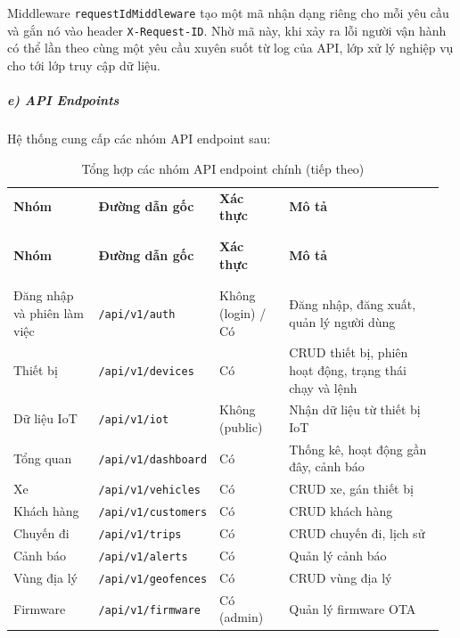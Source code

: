 \documentclass[a4paper]{extarticle}
\newcommand{\thesissettableid}[2]{%
  \renewcommand{\thetable}{#1}%
  \renewcommand{\theHtable}{#2}%
}
\begin{document}
Middleware \texttt{requestIdMiddleware} tạo một mã nhận dạng riêng cho
mỗi yêu cầu và gắn nó vào header \texttt{X-Request-ID}. Nhờ mã này, khi
xảy ra lỗi người vận hành có thể lần theo cùng một yêu cầu xuyên suốt từ
log của API, lớp xử lý nghiệp vụ cho tới lớp truy cập dữ liệu.

\subparagraph{e) API Endpoints}\label{e-api-endpoints}

Hệ thống cung cấp các nhóm API endpoint sau:


{\thesissettableid{4.8}{tab-ch4-tong-hop-cac-nhom-api-endpoint-chinh}
\def\LTcaptype{table}
\begin{longtable}{|L{0.213\linewidth}|L{0.141\linewidth}|L{0.172\linewidth}|L{0.429\linewidth}|}
\caption{Tổng hợp các nhóm API endpoint chính}\label{tab:ch4-tong-hop-cac-nhom-api-endpoint-chinh}\\
\hline \textbf{Nhóm} & \textbf{Đường dẫn gốc} & \textbf{Xác thực} & \textbf{Mô tả} \\
\\\hline
\endfirsthead
\caption[]{Tổng hợp các nhóm API endpoint chính (tiếp theo)}\\
\hline \textbf{Nhóm} & \textbf{Đường dẫn gốc} & \textbf{Xác thực} & \textbf{Mô tả} \\
\\\hline
\endhead
\\\hline
\endfoot
\endlastfoot
Đăng nhập và phiên làm việc & \nolinkurl{/api/v1/auth} & Không (login) / Có & Đăng nhập,
đăng xuất, quản lý người dùng \\\hline
Thiết bị & \nolinkurl{/api/v1/devices} & Có & CRUD thiết bị, phiên hoạt động,
trạng thái chạy và lệnh \\\hline
Dữ liệu IoT & \nolinkurl{/api/v1/iot} & Không (public) & Nhận dữ liệu từ thiết
bị IoT \\\hline
Tổng quan & \nolinkurl{/api/v1/dashboard} & Có & Thống kê, hoạt động gần
đây, cảnh báo \\\hline
Xe & \nolinkurl{/api/v1/vehicles} & Có & CRUD xe, gán thiết bị \\\hline
Khách hàng & \nolinkurl{/api/v1/customers} & Có & CRUD khách hàng \\\hline
Chuyến đi & \nolinkurl{/api/v1/trips} & Có & CRUD chuyến đi, lịch sử \\\hline
Cảnh báo & \nolinkurl{/api/v1/alerts} & Có & Quản lý cảnh báo \\\hline
Vùng địa lý & \nolinkurl{/api/v1/geofences} & Có & CRUD vùng địa lý \\\hline
Firmware & \nolinkurl{/api/v1/firmware} & Có (admin) & Quản lý firmware
OTA \\\hline
\end{longtable}
}
\end{document}
